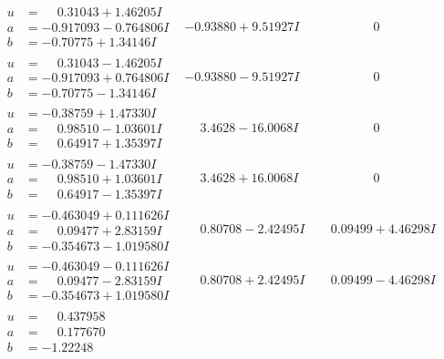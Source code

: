 \documentclass[1p]{elsarticle_modified}
\theoremstyle{definition}
\begin{document}
$$\begin{array}{c|c|c}
\begin{aligned}
u &= \phantom{-}0.31043 + 1.46205 I \\
a &= -0.917093 - 0.764806 I \\
b &= -0.70775 + 1.34146 I\end{aligned}
 & -0.93880 + 9.51927 I & \phantom{-0.000000 } 0 \\ \hline\begin{aligned}
u &= \phantom{-}0.31043 - 1.46205 I \\
a &= -0.917093 + 0.764806 I \\
b &= -0.70775 - 1.34146 I\end{aligned}
 & -0.93880 - 9.51927 I & \phantom{-0.000000 } 0 \\ \hline\begin{aligned}
u &= -0.38759 + 1.47330 I \\
a &= \phantom{-}0.98510 - 1.03601 I \\
b &= \phantom{-}0.64917 + 1.35397 I\end{aligned}
 & \phantom{-}3.4628 - 16.0068 I & \phantom{-0.000000 } 0 \\ \hline\begin{aligned}
u &= -0.38759 - 1.47330 I \\
a &= \phantom{-}0.98510 + 1.03601 I \\
b &= \phantom{-}0.64917 - 1.35397 I\end{aligned}
 & \phantom{-}3.4628 + 16.0068 I & \phantom{-0.000000 } 0 \\ \hline\begin{aligned}
u &= -0.463049 + 0.111626 I \\
a &= \phantom{-}0.09477 + 2.83159 I \\
b &= -0.354673 - 1.019580 I\end{aligned}
 & \phantom{-}0.80708 - 2.42495 I & \phantom{-}0.09499 + 4.46298 I \\ \hline\begin{aligned}
u &= -0.463049 - 0.111626 I \\
a &= \phantom{-}0.09477 - 2.83159 I \\
b &= -0.354673 + 1.019580 I\end{aligned}
 & \phantom{-}0.80708 + 2.42495 I & \phantom{-}0.09499 - 4.46298 I \\ \hline\begin{aligned}
u &= \phantom{-}0.437958\phantom{ +0.000000I} \\
a &= \phantom{-}0.177670\phantom{ +0.000000I} \\
b &= -1.22248\phantom{ +0.000000I}\end{aligned}

\end{array}$$
\end{document}
